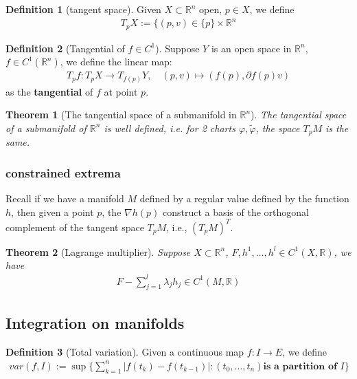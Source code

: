 \documentclass[12pt,fleqn]{book}
\newtheorem{theorem}{Theorem}[section]
\theoremstyle{definition}
\newtheorem{definition}{Definition}[section]
\begin{document}
\begin{definition}[tangent space]
	Given $X \subset \mathbb{R}^n$ open, $p \in X$, we define
	\begin{align*}
		T_pX:= \{ (p, v) \in \{p\} \times \mathbb{R}^n
	\end{align*}
\end{definition}

\begin{definition}[Tangential of $f \in C^1$]
 Suppose $Y$ is an open space in $\mathbb{R}^n$, $f \in C^1(\mathbb{R}^n)$, we define the linear map:
\begin{align*}
	T_p f: T_p X \rightarrow T_{f(p)} Y,\quad 
	(p, v) \mapsto (f(p), \partial f(p) v)
\end{align*}
as the \textbf{tangential} of $f$ at point $p$.	
\end{definition}

\begin{theorem}[The tangential space of a submanifold in $\mathbb{R}^n$]
The tangential space of a submanifold of $\mathbb{R}^n$ is well defined, i.e. for 2 charts $\varphi, \tilde{\varphi}$, the space $T_p M$ is the same. 
\end{theorem}

\subsubsection*{constrained extrema}
Recall if we have a manifold $M$ defined by a regular value defined by the function $h$, then given a point $p$, the $\nabla h(p)$ construct a basis of the orthogonal complement of the tangent space $T_p M$, i.e., $(T_p M)^T$. 
\begin{theorem}[Lagrange multiplier]
	Suppose $X \subset \mathbb{R}^n$, $F, h^1, \dots, h^l \in C^1(X, \mathbb{R})$, we have
	\begin{align*}
		F - \sum_{j = 1}^l \lambda_j h_j \in C^1(M, \mathbb{R})
	\end{align*}
\end{theorem}


\subsection{Integration on manifolds}
\begin{definition}[Total variation]
	Given a continuous map $f : I \rightarrow E$, we define
	\begin{align*}
		var(f, I):= \sup \{ \sum_{k = 1}^n |f(t_k) - f(t_{k-1})|: (t_0, \dots, t_n) \textbf{is a partition of } I \}
	\end{align*}
\end{definition}
\end{document}
